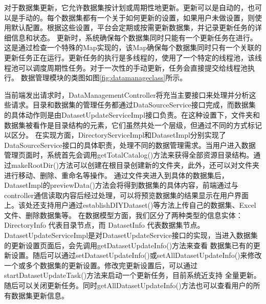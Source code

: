 对于数据集更新，它允许数据集按计划或周期性地更新。更新可以是自动的，也可以是手动的。每个数据集都有一个关于如何更新的设置，如果用户未做设置，则使用默认配置。根据这些设置，平台会定期或按需更新数据集，并记录更新任务的详细信息和状态。
更新时，系统确保每个数据集同时只能有一个更新任务在进行。这是通过检查一个特殊的Map实现的，该Map确保每个数据集同时只有一个关联的更新任务正在运行。更新任务的执行是多线程的，使用了一个特定的线程池，该线程池可以调度周期性任务。对于一次性的手动更新，任务会直接提交给线程池执行。
数据管理模块的类图如图\ref{fig:datamanageclass}所示。

当前端发出请求时，DataManagementController将充当主要接口来处理并分析这些请求。目录和数据集的管理任务都通过DataSourceService接口完成，而数据集的具体动作则是由DatasetUpdateServiceImpl接口负责。在这种设置下，文件夹和数据集被看作是目录结构的元素，它们虽然共处一个层级，但通过不同的方式标记以区分。
在实现方面，DirectoryServiceImpl和DatasetImpl分别实现了DataSourceService接口的具体职责，处理不同的数据管理需求。当用户进入数据管理页面时，系统首先会调用getTotalCatalog()方法来获得全部资源目录结构。通过makeRootDir()方法可以创建在根目录创建新的文件夹，此外，还可以对文件夹进行移动、删除、重命名等操作。
通过文件夹进入到具体的数据集后，DatasetImpl的previewData()方法会将得到数据集的具体内容，前端通过与controller通信读取内容后经过处理，可以将预览数据集的结果显示在用户界面上。该处还支持用户通过establishDIYDataset()等方法上传自己的数据集、Excel文件、删除数据集等。
在数据模型方面，我们区分了两种类型的信息实体：DirectoryInfo 代表目录节点，而 DatasetInfo 代表数据集节点。DatasetUpdateServiceImpl是对DatasetUpdateService接口的实现，当进入数据集的更新设置页面后，会先调用getDatasetUpdateInfo()方法来查看
数据集已有的更新设置。随后可以通过setDatasetUpdateInfo()或setAllDatasetUpdateInfo()来修改一个或多个数据集的更新设置。修改完更新设置后，可以通过startDatasetUpdateTask()方法来启动一个更新任务，目前系统近支持
全量更新。随后可以关闭更新任务。同时getAllDatasetUpdateInfo()方法也可以查看用户的所有数据集更新信息。
